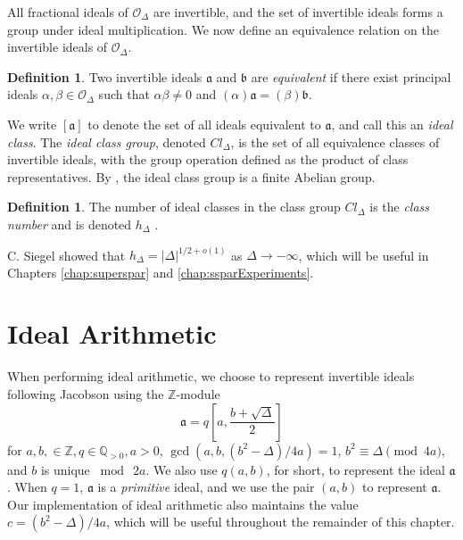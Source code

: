 \documentclass{ucalgthes1}
\theoremstyle{definition}
\newtheorem{defn}[thm]{Definition}
\newcommand{\ZZ}{\mathbb{Z}}
\newcommand{\QQgtz}{\mathbb{Q}_{>0}}
\newcommand{\OO}{\mathcal{O}}
\newcommand{\ideal}{\mathfrak}
\newcommand{\idealclass}[1]{\left[ \ideal #1 \right]}
\newcommand{\aclass}{\idealclass a}
\begin{document}
All fractional ideals of $\OO_\Delta$ are invertible, and the set of invertible ideals forms a group under ideal multiplication.  We now define an equivalence relation on the invertible ideals of $\OO_\Delta$.

\begin{defn}
\cite[p.88]{Jacobson2009} Two invertible ideals $\ideal a$ and $\ideal b$ are \emph{equivalent} if there exist principal ideals $\alpha, \beta \in \OO_\Delta$ such that $\alpha \beta \neq 0$ and $(\alpha)\ideal a = (\beta) \ideal b$.
\end{defn}

We write $\aclass$ to denote the set of all ideals equivalent to $\ideal a$, and call this an \emph{ideal class}.  The \emph{ideal class group}, denoted $Cl_\Delta$, is the set of all equivalence classes of invertible ideals, with the group operation defined as the product of class representatives.  By \cite[p.136]{Cohn1980}, the ideal class group is a finite Abelian group.

\begin{defn}
The number of ideal classes in the class group $Cl_\Delta$ is the \emph{class number} and is denoted $h_\Delta$ \cite[p.153]{Jacobson2009}.
\end{defn}

\noindent
C. Siegel \cite[p.247]{Crandall2001} showed that $h_\Delta = |\Delta|^{1/2 + o(1)}$ as $\Delta \rightarrow -\infty$, which will be useful in Chapters \ref{chap:superspar} and \ref{chap:ssparExperiments}.


\section{Ideal Arithmetic}
\label{sec:idealArithmetic}

When performing ideal arithmetic, we choose to represent invertible ideals following Jacobson \cite[p.13, Equation 2.1]{Jacobson1999} using the $\ZZ$-module
\[
	\ideal a = q\left[a, \frac{b+\sqrt{\Delta}}{2} \right]
\]
for $a, b, \in \ZZ, q \in \QQgtz, a > 0$, $\gcd(a, b, (b^2-\Delta)/4a) = 1$, $b^2 \equiv \Delta \pmod{4a}$, and $b$ is unique $\bmod ~2a$.  We also use $q(a, b)$, for short, to represent the ideal $\ideal a$.  When $q = 1$, $\ideal a$ is a \emph{primitive} ideal, and we use the pair $(a, b)$ to represent $\ideal a$.  Our implementation of ideal arithmetic also maintains the value $c = (b^2 - \Delta)/4a$, which will be useful throughout the remainder of this chapter.
\end{document}
